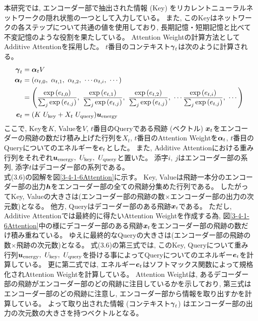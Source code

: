 本研究では, エンコーダー部で抽出された情報 (Key) をリカレントニューラルネットワークの隠れ状態の一つとして入力している。
また, このKeyはネットワークの各ステップについて共通の値を使用しており, 長期記憶・短期記憶と比べて不変記憶のような役割を果たしている。
Attention Weightの計算方法としてAdditive Attentionを採用した。
$t$番目のコンテキスト${\mbox{\boldmath{$\gamma$}}}_{t}$は次のように計算される。
\begin{equation}
 \begin{split}
  {\mbox{\boldmath{$\gamma$}}}_{t} 
  &= {\mbox{\boldmath{$\alpha$}}}_{t} V\\
  {\mbox{\boldmath{$\alpha$}}}_{t}
  &= (\alpha_{t,0},\ \alpha_{t,1},\ \alpha_{t,2},\ \cdots \alpha_{t,i},\ \cdots) \\
  &= \left(\frac{\exp{({{e}}_{t,0})}}{\sum_j \exp{({{e}}_{t,j})}},\ \frac{\exp{({{e}}_{t,1})}}{\sum_j \exp{({{e}}_{t,j})}},\ \frac{\exp{({{e}}_{t,2})}}{\sum_j \exp{({{e}}_{t,j})}},\  \cdots \frac{\exp{({{e}}_{t,i})}}{\sum_j \exp{({{e}}_{t,j})}},\ \cdots\right)\\
  {\mbox{\boldmath{$e$}}}_{t}
  &=(K\ U_{\rm key} + X_t\ U_{\rm query}) {\mbox{\boldmath{$u$}}}_{\rm energy} \\
 \end{split}
\end{equation}
ここで, Keyを$K$, Valueを$V$, $t$番目のQueryである飛跡 (ベクトル) ${\mbox{\boldmath{$x$}}}_{t}$をエンコーダーの飛跡の数だけ積み上げた行列を$X_t$, $t$番目のAttention Weightを${\mbox{\boldmath{$\alpha$}}}_{t}$, $t$番目のQueryについてのエネルギーを${\mbox{\boldmath{$e$}}}_{t}$とした。
また, Additive Attentionにおける重み行列をそれぞれ${\mbox{\boldmath{$u$}}}_{\rm energy},\  U_{\rm key},\ U_{\rm query}$と置いた。
添字$i,\ j$はエンコーダー部の系列, 添字$t$はデコーダー部の系列である。\\

式(3.6)の図解を図\ref{3-4-1-6Attention}に示す。
Key, Valueは飛跡一本分のエンコーダー部の出力${\mbox{\boldmath{$h$}}}$をエンコーダー部の全ての飛跡分集めた行列である。
したがってKey, Valueの大きさは(エンコーダー部の飛跡の数$\times$エンコーダー部の出力の次元数)となる。
他方, Queryはデコーダー部のある飛跡${\mbox{\boldmath{$x$}}}_{t}$である。
ただし, Additive Attentionでは最終的に得たいAttention Weightを作成する為, 図\ref{3-4-1-6Attention}中の様にデコーダー部のある飛跡${\mbox{\boldmath{$x$}}}_{t}$をエンコーダー部の飛跡の数だけ積み重ねている。
ゆえに最終的なQueryの大きさは(エンコーダー部の飛跡の数$\times$飛跡の次元数)となる。
式(3.6)の第三式では, このKey, Queryについて重み行列${\mbox{\boldmath{$u$}}}_{\rm energy},\  U_{\rm key},\ U_{\rm query}$を掛ける事によってQueryについてのエネルギー${\mbox{\boldmath{$e$}}}_{t}$を計算している。
更に第二式では, エネルギー${\mbox{\boldmath{$e$}}}_{t}$はソフトマックス関数によって規格化されAttention Weightを計算している。
Attention Weightは, あるデコーダー部の飛跡がエンコーダー部のどの飛跡に注目しているかを示しており, 第三式はエンコーダー部のどの飛跡に注意し, エンコーダー部から情報を取り出すかを計算している。
よって取り出された情報 (コンテキスト${\mbox{\boldmath{$\gamma$}}}_{t}$) はエンコーダー部の出力の次元数の大きさを持つベクトルとなる。

